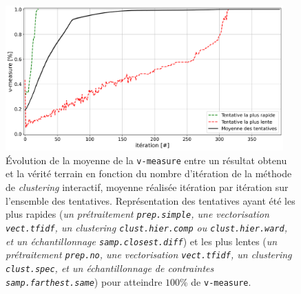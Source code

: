 			\begin{figure}[!htb]
				\centering
				\includegraphics[width=0.95\textwidth]{figures/etude-efficacite-evolution-moyenne-0par-iteration}
				\caption{
					Évolution de la moyenne de la \texttt{v-measure} entre un résultat obtenu et la vérité terrain en fonction du nombre d'itération de la méthode de \textit{clustering} interactif, moyenne réalisée itération par itération sur l'ensemble des tentatives.
					Représentation des tentatives ayant été les plus rapides (\textit{un prétraitement \texttt{prep.simple}, une vectorisation \texttt{vect.tfidf}, un \textit{clustering} \texttt{clust.hier.comp} ou \texttt{clust.hier.ward}, et un échantillonnage \texttt{samp.closest.diff}}) et les plus lentes (\textit{un prétraitement \texttt{prep.no}, une vectorisation \texttt{vect.tfidf}, un \textit{clustering} \texttt{clust.spec}, et un échantillonnage de contraintes \texttt{samp.farthest.same}}) pour atteindre $100$\% de \texttt{v-measure}.
				}
				\label{figure:4.1.1-ETUDE-CONVERGENCE-EVOLUTION}
			\end{figure}
